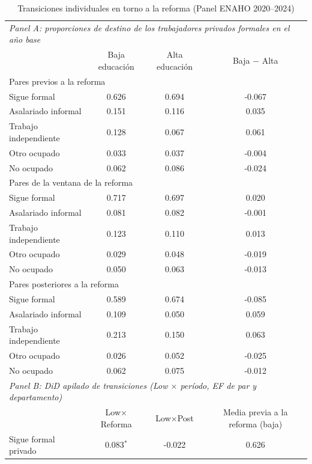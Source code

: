 \begin{table}[!tbp]\centering
\caption{Transiciones individuales en torno a la reforma (Panel ENAHO 2020--2024)}\label{tab:transitions}
\begin{threeparttable}
\footnotesize
\setlength{\tabcolsep}{5pt}
\begin{tabular}{lccc}
\toprule
\multicolumn{4}{l}{\emph{Panel A: proporciones de destino de los trabajadores privados formales en el año base}} \\
 & Baja educación & Alta educación & Baja $-$ Alta \\
\midrule
\multicolumn{4}{l}{Pares previos a la reforma} \\
\quad Sigue formal & 0.626 & 0.694 & -0.067 \\
\quad Asalariado informal & 0.151 & 0.116 & 0.035 \\
\quad Trabajo independiente & 0.128 & 0.067 & 0.061 \\
\quad Otro ocupado & 0.033 & 0.037 & -0.004 \\
\quad No ocupado & 0.062 & 0.086 & -0.024 \\
\multicolumn{4}{l}{Pares de la ventana de la reforma} \\
\quad Sigue formal & 0.717 & 0.697 & 0.020 \\
\quad Asalariado informal & 0.081 & 0.082 & -0.001 \\
\quad Trabajo independiente & 0.123 & 0.110 & 0.013 \\
\quad Otro ocupado & 0.029 & 0.048 & -0.019 \\
\quad No ocupado & 0.050 & 0.063 & -0.013 \\
\multicolumn{4}{l}{Pares posteriores a la reforma} \\
\quad Sigue formal & 0.589 & 0.674 & -0.085 \\
\quad Asalariado informal & 0.109 & 0.050 & 0.059 \\
\quad Trabajo independiente & 0.213 & 0.150 & 0.063 \\
\quad Otro ocupado & 0.026 & 0.052 & -0.025 \\
\quad No ocupado & 0.062 & 0.075 & -0.012 \\
\midrule
\multicolumn{4}{l}{\emph{Panel B: DiD apilado de transiciones (Low $\times$ período, EF de par y departamento)}} \\
 & Low$\times$Reforma & Low$\times$Post & Media previa a la reforma (baja) \\ \midrule
Sigue formal privado & 0.083$^{*}$ & -0.022 & 0.626 \\

\end{tabular}
\end{threeparttable}
\end{table}
